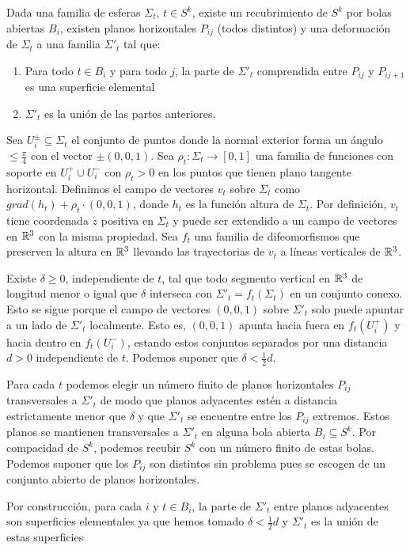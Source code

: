 \documentclass[twoside, 11pt]{article}
\begin{document}
\begin{prop}[de normalización]
Dada una familia de esferas $\Sigma_t$, $t\in S^k$, existe un recubrimiento de $S^k$ por bolas abiertas $B_i$, existen planos horizontales $P_{ij}$ (todos distintos) y una deformación de $\Sigma_t$ a una familia $\Sigma'_t$ tal que:
\begin{enumerate}
\item Para todo $t\in B_i$ y para todo $j$, la parte de $\Sigma'_t$ comprendida entre $P_{ij}$ y $P_{ij+1}$ es una superficie elemental
\item $\Sigma'_t$ es la unión de las partes anteriores. 
\end{enumerate}
\end{prop}
\begin{dem}
Sea $U_i^{\pm}\subseteq\Sigma_t$ el conjunto de puntos donde la normal exterior forma un ángulo $\leq\frac{\pi}{4}$ con el vector $\pm(0,0,1)$. Sea $\rho_t:\Sigma_t\to [0,1]$ una familia de funciones con soporte en $U_i^+\cup U_i^-$ con $\rho_t>0$ en los puntos que tienen plano tangente horizontal. Definimos el campo de vectores $v_t$ sobre $\Sigma_t$ como $grad(h_t)+\rho_t\cdot(0,0,1)$, donde $h_t$ es la función altura de $\Sigma_t$. Por definición, $v_t$ tiene coordenada $z$ positiva en $\Sigma_t$ y puede ser extendido a un campo de vectores en $\mathbb{R}^3$ con la misma propiedad. Sea $f_t$ una familia de difeomorfismos que preserven la altura en $\mathbb{R}^3$ llevando las trayectorias de $v_t$ a líneas verticales de $\mathbb{R}^3$. 

Existe $\delta\geq 0$, independiente de $t$, tal que todo segmento vertical en $\mathbb{R}^3$ de longitud menor o igual que $\delta$ interseca con $\Sigma'_t=f_t(\Sigma_t)$ en un conjunto conexo. Esto se sigue porque el campo de vectores $(0,0,1)$ sobre $\Sigma'_t$ solo puede apuntar a un lado de $\Sigma'_t$ localmente. Esto es, $(0,0,1)$ apunta hacia fuera en $f_t(U_i^+)$ y hacia dentro en $f_t(U_i^-)$, estando estos conjuntos separados por una distancia $d>0$ independiente de $t$. Podemos suponer que $\delta<\frac{1}{2}d$. 

Para cada $t$ podemos elegir un número finito de planos horizontales $P_{ij}$ transversales a $\Sigma'_t$ de modo que planos adyacentes estén a distancia estrictamente menor que $\delta$ y que $\Sigma'_t$ se encuentre entre los $P_{ij}$ extremos. Estos planos se mantienen transversales a $\Sigma'_t$ en alguna bola abierta $B_i\subseteq S^k$. Por compacidad de $S^k$, podemos recubir $S^k$ con un número finito de estas bolas. Podemos suponer que los $P_{ij}$ son distintos sin problema pues se escogen de un conjunto abierto de planos horizontales. 

Por construcción, para cada $i$ y $t\in B_i$, la parte de $\Sigma'_t$ entre planos adyacentes son superficies elementales ya que hemos tomado $\delta<\frac{1}{2}d$ y $\Sigma'_t$ es la unión de estas superficies
\QED
\end{dem}
\end{document}
